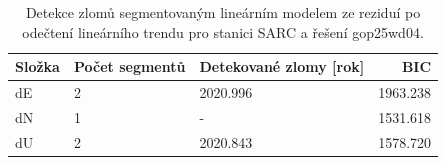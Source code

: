 \begin{table}[htbp]
\caption{Detekce zlomů segmentovaným lineárním modelem ze reziduí po odečtení lineárního trendu pro stanici SARC a řešení gop25wd04.}
\label{tab:gop25wd04_stcd_sarc_detr_weighted_1seg_jumps_piecewise_bic}
\begin{tabular}{lllr}
\toprule
Složka & Počet segmentů & Detekované zlomy [rok] & BIC \\
\midrule
dE & 2 & 2020.996 & 1963.238 \\
dN & 1 & - & 1531.618 \\
dU & 2 & 2020.843 & 1578.720 \\
\bottomrule
\end{tabular}
\end{table}
